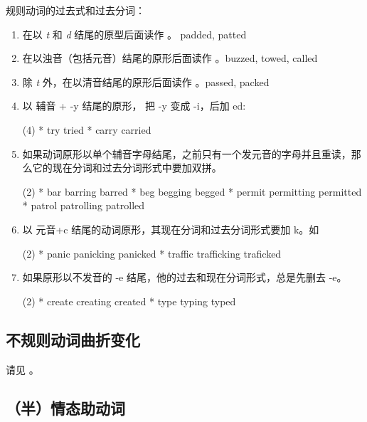 规则动词的过去式和过去分词：
\begin{enumerate}
\item 在以 \emph{t} 和 \emph{d} 结尾的原型后面读作 。 padded, patted
\item 在以浊音（包括元音）结尾的原形后面读作 。buzzed, towed, called
\item 除 \emph{t} 外，在以清音结尾的原形后面读作 。passed, packed
\item 以 辅音 + -y 结尾的原形， 把 -y 变成 -i，后加 ed:
  \begin{taskitem}(4)
    * try \Rightarrow tried
    * carry  \Rightarrow carried
  \end{taskitem}

\item 如果动词原形以单个辅音字母结尾，之前只有一个发元音的字母并且重读，那么它的现在分词和过去分词形式中要加双拼。
  \begin{taskitem}(2)
    * bar \Rightarrow barring \Rightarrow barred
    * beg \Rightarrow begging \Rightarrow begged
    * permit \Rightarrow permitting \Rightarrow permitted
    * patrol \Rightarrow patrolling \Rightarrow patrolled
  \end{taskitem}

\item 以 元音+c 结尾的动词原形，其现在分词和过去分词形式要加 k。如
  \begin{taskitem}(2)
    * panic \Rightarrow panicking \Rightarrow panicked
    * traffic \Rightarrow trafficking \Rightarrow traficked
  \end{taskitem}

\item 如果原形以不发音的 -e 结尾，他的过去和现在分词形式，总是先删去 -e。
  \begin{taskitem}(2)
    * create \Rightarrow creating \Rightarrow created
    * type \Rightarrow typing \Rightarrow typed
  \end{taskitem}
\end{enumerate}

\subsection{不规则动词曲折变化}

请见 。

\subsection{（半）情态助动词}


